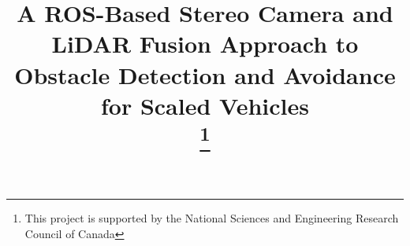 \documentclass[conference]{IEEEtran}
\begin{document}
\title{A ROS-Based Stereo Camera and LiDAR Fusion Approach to Obstacle Detection and Avoidance for Scaled Vehicles\\
\thanks{This project is supported by the National Sciences and Engineering Research Council of Canada}
}

\author{
 }
%
\maketitle
\end{document}

